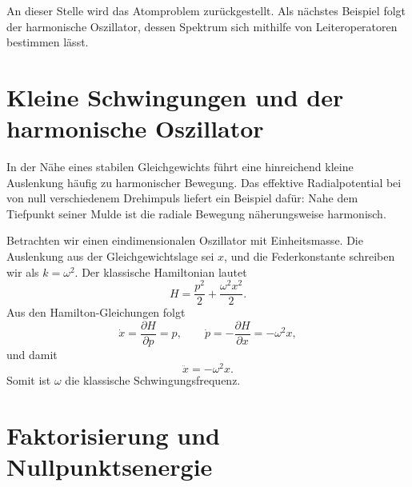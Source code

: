 \begin{classroomqa}\end{classroomqa}

An dieser Stelle wird das Atomproblem zurückgestellt. Als nächstes Beispiel folgt der harmonische Oszillator, dessen Spektrum sich mithilfe von Leiteroperatoren bestimmen lässt.

\section{Kleine Schwingungen und der harmonische Oszillator}

In der Nähe eines stabilen Gleichgewichts führt eine hinreichend kleine Auslenkung häufig zu harmonischer Bewegung. Das effektive Radialpotential bei von null verschiedenem Drehimpuls liefert ein Beispiel dafür: Nahe dem Tiefpunkt seiner Mulde ist die radiale Bewegung näherungsweise harmonisch.

Betrachten wir einen eindimensionalen Oszillator mit Einheitsmasse. Die Auslenkung aus der Gleichgewichtslage sei \(x\), und die Federkonstante schreiben wir als \(k=\omega^2\). Der klassische Hamiltonian lautet
\begin{equation}
H=\frac{p^2}{2}+\frac{\omega^2x^2}{2}.
\end{equation}
Aus den Hamilton-Gleichungen folgt
\begin{equation}
\dot{x}=\frac{\partial H}{\partial p}=p,
\qquad
\dot{p}=-\frac{\partial H}{\partial x}=-\omega^2x,
\end{equation}
und damit
\begin{equation}
\ddot{x}=-\omega^2x.
\end{equation}
Somit ist \(\omega\) die klassische Schwingungsfrequenz.

\section{Faktorisierung und Nullpunktsenergie}

